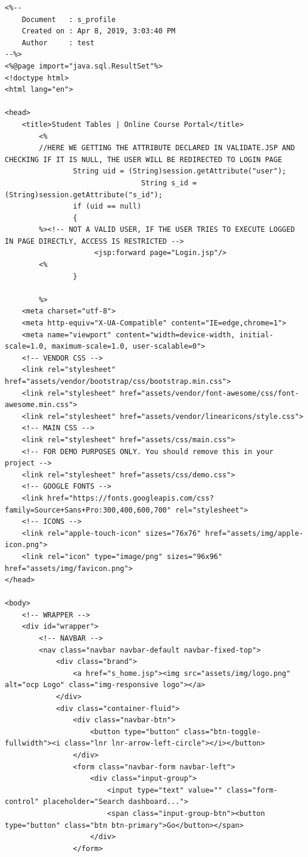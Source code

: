 \begin{verbatim}
<%-- 
    Document   : s_profile
    Created on : Apr 8, 2019, 3:03:40 PM
    Author     : test
--%>
<%@page import="java.sql.ResultSet"%>
<!doctype html>
<html lang="en">

<head>
	<title>Student Tables | Online Course Portal</title>
        <%
		//HERE WE GETTING THE ATTRIBUTE DECLARED IN VALIDATE.JSP AND CHECKING IF IT IS NULL, THE USER WILL BE REDIRECTED TO LOGIN PAGE
				String uid = (String)session.getAttribute("user");
                                String s_id = (String)session.getAttribute("s_id");
				if (uid == null)
				{
		%><!-- NOT A VALID USER, IF THE USER TRIES TO EXECUTE LOGGED IN PAGE DIRECTLY, ACCESS IS RESTRICTED -->
					 <jsp:forward page="Login.jsp"/>
		<%	
				}
				
		%> 
	<meta charset="utf-8">
	<meta http-equiv="X-UA-Compatible" content="IE=edge,chrome=1">
	<meta name="viewport" content="width=device-width, initial-scale=1.0, maximum-scale=1.0, user-scalable=0">
	<!-- VENDOR CSS -->
	<link rel="stylesheet" href="assets/vendor/bootstrap/css/bootstrap.min.css">
	<link rel="stylesheet" href="assets/vendor/font-awesome/css/font-awesome.min.css">
	<link rel="stylesheet" href="assets/vendor/linearicons/style.css">
	<!-- MAIN CSS -->
	<link rel="stylesheet" href="assets/css/main.css">
	<!-- FOR DEMO PURPOSES ONLY. You should remove this in your project -->
	<link rel="stylesheet" href="assets/css/demo.css">
	<!-- GOOGLE FONTS -->
	<link href="https://fonts.googleapis.com/css?family=Source+Sans+Pro:300,400,600,700" rel="stylesheet">
	<!-- ICONS -->
	<link rel="apple-touch-icon" sizes="76x76" href="assets/img/apple-icon.png">
	<link rel="icon" type="image/png" sizes="96x96" href="assets/img/favicon.png">
</head>

<body>
	<!-- WRAPPER -->
	<div id="wrapper">
		<!-- NAVBAR -->
		<nav class="navbar navbar-default navbar-fixed-top">
			<div class="brand">
				<a href="s_home.jsp"><img src="assets/img/logo.png" alt="ocp Logo" class="img-responsive logo"></a>
			</div>
			<div class="container-fluid">
				<div class="navbar-btn">
					<button type="button" class="btn-toggle-fullwidth"><i class="lnr lnr-arrow-left-circle"></i></button>
				</div>
				<form class="navbar-form navbar-left">
					<div class="input-group">
						<input type="text" value="" class="form-control" placeholder="Search dashboard...">
						<span class="input-group-btn"><button type="button" class="btn btn-primary">Go</button></span>
					</div>
				</form>
			

\end{verbatim}
